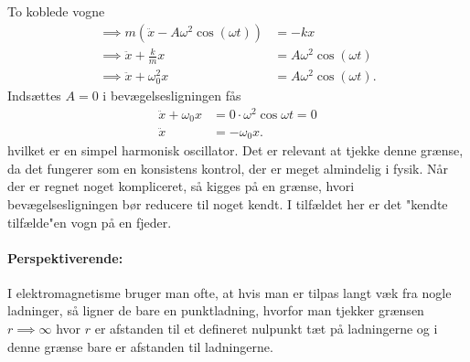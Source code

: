\documentclass[crop=false, class=memoir]{standalone}
\begin{document}
\begin{opgave}[2]{To koblede vogne}
\begin{align*}
	\implies m(\ddot{x} - A\omega^2\cos(\omega t)) &= -kx \\
	\implies \ddot{x} + \frac{k}{m}x &= A\omega^2\cos(\omega t) \\\implies \ddot{x} + \omega_0^2x &= A\omega^2\cos(\omega t).
\end{align*}
%
\opg Indsættes $A=0$ i bevægelsesligningen fås
%
\begin{align*}
	\ddot{x} + \omega_0x &= 0\cdot\omega^2\cos\omega t = 0 \\
	\ddot{x} &= -\omega_0x.
\end{align*}
%
hvilket er en simpel harmonisk oscillator.
%
\opg Det er relevant at tjekke denne grænse, da det fungerer som en konsistens kontrol, der er meget almindelig i fysik. Når der er regnet noget kompliceret, så kigges på en grænse, hvori bevægelsesligningen bør reducere til noget kendt. I tilfældet her er det "kendte tilfælde"\;en vogn på en fjeder. \\
%
\paragraph{Perspektiverende:} I elektromagnetisme bruger man ofte, at hvis man er tilpas langt væk fra nogle ladninger, så ligner de bare en punktladning, hvorfor man tjekker grænsen $r\implies\infty$ hvor $r$ er afstanden til et defineret nulpunkt tæt på ladningerne og i denne grænse bare er afstanden til ladningerne.
\end{opgave}
\end{document}
